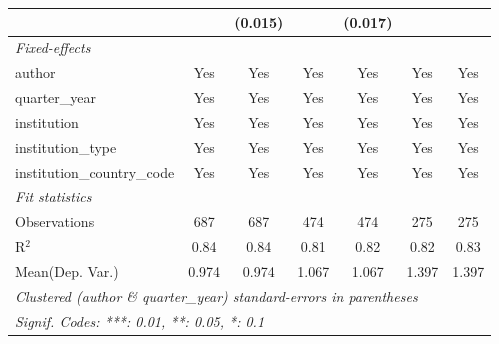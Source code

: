 \begin{tabular}{lcccccc}
                                            &               & (0.015)        &               & (0.017)        &              &   \\   
   \midrule
   \emph{Fixed-effects}\\
   author                                   & Yes           & Yes            & Yes           & Yes            & Yes          & Yes\\  
   quarter\_year                            & Yes           & Yes            & Yes           & Yes            & Yes          & Yes\\  
   institution                              & Yes           & Yes            & Yes           & Yes            & Yes          & Yes\\  
   institution\_type                        & Yes           & Yes            & Yes           & Yes            & Yes          & Yes\\  
   institution\_country\_code               & Yes           & Yes            & Yes           & Yes            & Yes          & Yes\\  
   \midrule
   \emph{Fit statistics}\\
   Observations                             & 687           & 687            & 474           & 474            & 275          & 275\\  
   R$^2$                                    & 0.84          & 0.84           & 0.81          & 0.82           & 0.82         & 0.83\\  
Mean(Dep. Var.) & 0.974 & 0.974 & 1.067 & 1.067 & 1.397 & 1.397 \\
   \midrule \midrule
   \multicolumn{7}{l}{\emph{Clustered (author \& quarter\_year) standard-errors in parentheses}}\\
   \multicolumn{7}{l}{\emph{Signif. Codes: ***: 0.01, **: 0.05, *: 0.1}}\\
\end{tabular}
\par\endgroup
